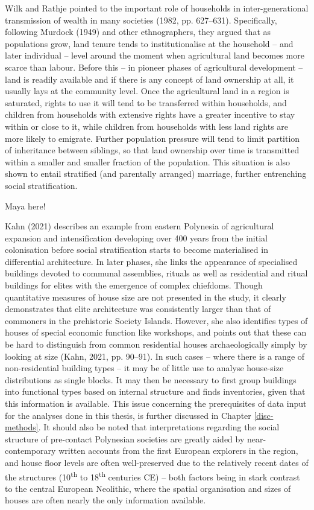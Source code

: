\documentclass[
  12pt,
]{book}
\begin{document}
Wilk and Rathje pointed to the important role of households in inter-generational transmission of wealth in many societies (1982, pp. 627--631). Specifically, following Murdock (1949) and other ethnographers, they argued that as populations grow, land tenure tends to institutionalise at the household -- and later individual -- level around the moment when agricultural land becomes more scarce than labour. Before this -- in pioneer phases of agricultural development -- land is readily available and if there is any concept of land ownership at all, it usually lays at the community level. Once the agricultural land in a region is saturated, rights to use it will tend to be transferred within households, and children from households with extensive rights have a greater incentive to stay within or close to it, while children from households with less land rights are more likely to emigrate. Further population pressure will tend to limit partition of inheritance between siblings, so that land ownership over time is transmitted within a smaller and smaller fraction of the population. This situation is also shown to entail stratified (and parentally arranged) marriage, further entrenching social stratification.

Maya here!

Kahn (2021) describes an example from eastern Polynesia of agricultural expansion and intensification developing over 400 years from the initial colonisation before social stratification starts to become materialised in differential architecture. In later phases, she links the appearance of specialised buildings devoted to communal assemblies, rituals as well as residential and ritual buildings for elites with the emergence of complex chiefdoms. Though quantitative measures of house size are not presented in the study, it clearly demonstrates that elite architecture was consistently larger than that of commoners in the prehistoric Society Islands. However, she also identifies types of houses of special economic function like workshops, and points out that these can be hard to distinguish from common residential houses archaeologically simply by looking at size (Kahn, 2021, pp. 90--91). In such cases -- where there is a range of non-residential building types -- it may be of little use to analyse house-size distributions as single blocks. It may then be necessary to first group buildings into functional types based on internal structure and finds inventories, given that this information is available. This issue concerning the prerequisites of data input for the analyses done in this thesis, is further discussed in Chapter \ref{disc-methods}. It should also be noted that interpretations regarding the social structure of pre-contact Polynesian societies are greatly aided by near-contemporary written accounts from the first European explorers in the region, and house floor levels are often well-preserved due to the relatively recent dates of the structures (10\textsuperscript{th} to 18\textsuperscript{th} centuries CE) -- both factors being in stark contrast to the central European Neolithic, where the spatial organisation and sizes of houses are often nearly the only information available.
\end{document}
